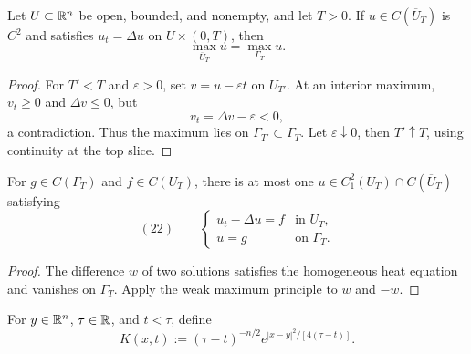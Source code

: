 \begin{theorem}
\label{thm:weak-maximum-principle-heat}





Let $U\subset\mathbb{R}^n$ be open, bounded, and nonempty, and let $T>0$. If
$u\in C(\overline U_T)$ is $C^2$ and satisfies $u_t=\Delta u$ on
$U\times(0,T)$, then
$$\max_{\overline U_T}u=\max_{\Gamma_T}u.$$
\end{theorem}
\begin{proof}

\sketch For $T'<T$ and $\varepsilon>0$, set $v=u-\varepsilon t$ on
$\overline U_{T'}$. At an interior maximum, $v_t\ge0$ and $\Delta v\le0$, but
$$v_t=\Delta v-\varepsilon<0,$$
a contradiction. Thus the maximum lies on $\Gamma_{T'}\subset\Gamma_T$.
Let $\varepsilon\downarrow0$, then $T'\uparrow T$, using continuity at the top
slice.
\end{proof}

\begin{theorem}
\label{thm:uniqueness-heat-bounded-domain}





For $g\in C(\Gamma_T)$ and $f\in C(U_T)$, there is at most one
$u\in C_1^2(U_T)\cap C(\overline U_T)$ satisfying
$$(22)\qquad
\begin{cases}
u_t-\Delta u=f&\text{in }U_T,\\
u=g&\text{on }\Gamma_T.
\end{cases}$$
\end{theorem}
\begin{proof}

\sketch The difference $w$ of two solutions satisfies the homogeneous heat
equation and vanishes on $\Gamma_T$. Apply the weak maximum principle to
$w$ and $-w$.
\end{proof}

\begin{definition}
\label{def:comparison-kernel}





For $y\in\mathbb{R}^n$, $\tau\in\mathbb{R}$, and $t<\tau$, define
$$K(x,t):=(\tau-t)^{-n/2}
e^{|x-y|^2/[4(\tau-t)]}.$$
\end{definition}


